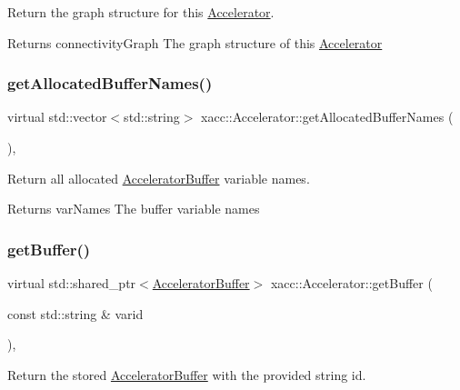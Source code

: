 Return the graph structure for this \hyperlink{a01613}{Accelerator}.

\begin{DoxyReturn}{Returns}
connectivity\+Graph The graph structure of this \hyperlink{a01613}{Accelerator} 
\end{DoxyReturn}
\mbox{\label{a01613_ae1463d7e405df89fa4af47e8922f4b82}} 
\subsubsection{\texorpdfstring{get\+Allocated\+Buffer\+Names()}{getAllocatedBufferNames()}}
{\footnotesize\ttfamily virtual std\+::vector$<$std\+::string$>$ xacc\+::\+Accelerator\+::get\+Allocated\+Buffer\+Names (\begin{DoxyParamCaption}{ }\end{DoxyParamCaption})\hspace{0.3cm}{\ttfamily [inline]}, {\ttfamily [virtual]}}

Return all allocated \hyperlink{a01625}{Accelerator\+Buffer} variable names.

\begin{DoxyReturn}{Returns}
var\+Names The buffer variable names 
\end{DoxyReturn}
\mbox{\label{a01613_ab3820be326e28a553fed1a824f4d41d0}} 
\subsubsection{\texorpdfstring{get\+Buffer()}{getBuffer()}}
{\footnotesize\ttfamily virtual std\+::shared\+\_\+ptr$<$\hyperlink{a01625}{Accelerator\+Buffer}$>$ xacc\+::\+Accelerator\+::get\+Buffer (\begin{DoxyParamCaption}\item[{const std\+::string \&}]{varid }\end{DoxyParamCaption})\hspace{0.3cm}{\ttfamily [inline]}, {\ttfamily [virtual]}}

Return the stored \hyperlink{a01625}{Accelerator\+Buffer} with the provided string id.


